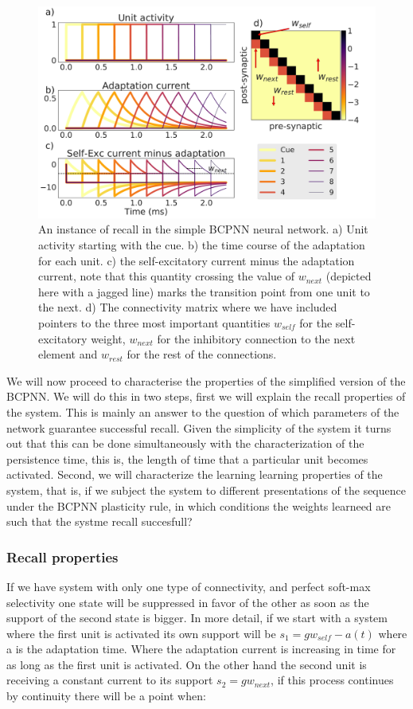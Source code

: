 \documentclass[10pt,a4paper]{article}
\begin{document}
\begin{figure}[H]
\centering
\includegraphics[scale=0.26]{simple_bcpnn_recall.pdf}
\caption{An instance of recall in the simple BCPNN neural network. a) Unit activity starting with the cue. b) the time course of the adaptation for each unit. c) the self-excitatory current minus the adaptation current, note that this quantity crossing the value of $w_{next}$ (depicted here with a jagged line) marks the transition point from one unit to the next. d) The connectivity matrix where we have included pointers to the three most important quantities $w_{self}$ for the self-excitatory weight, $w_{next}$ for the inhibitory connection to the next element and $w_{rest}$ for the rest of the connections.}
\label{fig:bcpnn_simple_recall}
\end{figure}

We will now proceed to characterise the properties of the simplified version of the BCPNN. We will do this in two steps, first we will explain the recall properties of the system. This is mainly an answer to the question of which parameters of the network guarantee successful recall. Given the simplicity of the system it turns out that this can be done simultaneously with the characterization of the persistence time, this is, the length of time that a particular unit becomes activated.  Second, we will characterize the learning learning properties of the system, that is, if we subject the system to different presentations of the sequence under the BCPNN plasticity rule, in which conditions the weights learneed are such that the systme recall succesfull?

\subsubsection{Recall properties}
If we have system with only one type of connectivity, and perfect soft-max selectivity one state will be suppressed in favor of the other as soon as the support of the second state is bigger. In more detail, if we start with a system where the first unit is activated its own support will be $s_1 = g w_{self} - a(t)$ where a is the adaptation time. Where the adaptation current is increasing in time for as long as the first unit is activated. On the other hand the second unit is receiving a constant current to its support $s_2 = g w_{next}$, if this process continues by continuity there will be a point when:
\end{document}
